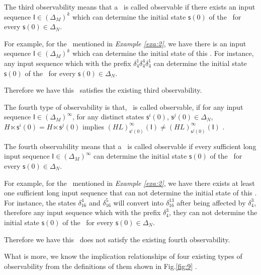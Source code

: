 The third observability means that a \BCN\ is called observable if there exists an input sequence $\mathsf{I}\in(\Delta_M)^k$ which can determine the initial state $\mathsf{s}(0)$ of the \BCN\ for every $\mathsf{s}(0)\in\Delta_N$.

\begin{example}
For example, for the \BCN\ mentioned in {\em Example \ref{exa:2}}, we have there is an input sequence $\mathsf{I}\in(\Delta_M)^k$ which can determine the initial state of this \BCN. For instance, any input sequence which with the prefix $\delta_{4}^1\delta_{4}^4\delta_{4}^1$ can determine the initial state $\mathsf{s}(0)$ of the \BCN\ for every $\mathsf{s}(0)\in\Delta_N$.

Therefore we have this \BCN\ satisfies the existing third observability.
\label{exa:6}
\end{example}  
\begin{definition}
	The fourth type of observability is that, \BCN\ is called observable, if for any input sequence $\mathsf{I}\in(\Delta_M)^{\infty}$, for any distinct states $\mathsf{s}^{i}(0)$, $\mathsf{s}^{j}(0) \in \Delta_N$, $H\ltimes\mathsf{s}^{i}(0)=H\ltimes\mathsf{s}^{j}(0)$ implies $(HL)^{\infty}_{\mathsf{s}^{i}(0)}(\mathsf{I})\neq (HL)^{\infty}_{\mathsf{s}^{j}(0)}(\mathsf{I})$ \cite{Fornasini2013Observability}.
\end{definition}

The fourth observability means that a \BCN\ is called observable if every sufficient long input sequence $\mathsf{I}\in(\Delta_M)^{\infty}$ can determine the initial state $\mathsf{s}(0)$ of the \BCN\ for every $\mathsf{s}(0)\in\Delta_N$.
\begin{example}
For example, for the \BCN\ mentioned in {\em Example \ref{exa:2}}, we have there exists at least one sufficient long input sequence that can not determine the initial state of this \BCN. For instance, the states $\delta_{16}^4$ and $\delta_{16}^5$  will convert into $\delta_{16}^{13}$ after being affected by $\delta_{4}^3$, therefore any input sequence which with the prefix $\delta_{4}^3$, they can not determine the initial state $\mathsf{s}(0)$ of the \BCN\ for every $\mathsf{s}(0)\in\Delta_N$.

Therefore we have this \BCN\ does not satisfy the existing fourth observability.
\label{exa:7}
\end{example}  

What is more, we know the implication relationships of four existing types of observability from the definitions of them shown in Fig.\ref{fig:9} \cite{Zhang2016Observability}. 

